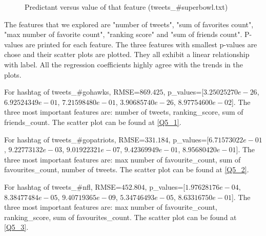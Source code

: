 \documentclass{article}
\begin{document}
\begin{figure}
\centering
{}
\caption{Predictant versus value of that feature (tweets\_\#superbowl.txt)} \label{Q5_6}
\end{figure}

The features that we explored are "number of tweets", "sum of favorites count", "max number of favorite count", "ranking score" and "sum of friends count". P-values are printed for each feature. The three features with smallest p-values are chose and their scatter plots are plotted. They all exhibit a linear relationship with label. All the regression coefficients highly agree with the trends in the plots.\newline

\indent For hashtag of tweets\_\#gohawks, RMSE=$869.425$, p\_values=[$3.25025270e-26$, $6.92524349e-01$, $7.21598480e-01$, $3.90685740e-26$, $8.97754600e-02$]. The three most important features are: number of tweets, ranking\_score, sum of friends\_count. The scatter plot can be found at \ref{Q5_1}.\newline

\indent For hashtag of tweets\_\#gopatriots, RMSE=$331.184$, p\_values=[$6.71573022e-01$, $9.22773132e-03$, $9.01922321e-07$, $9.42369949e-01$, $8.95680420e-01$]. The three most important features are: max number of favourite\_count, sum of favourites\_count, number of tweets. The scatter plot can be found at \ref{Q5_2}.\newline

\indent For hashtag of tweets\_\#nfl, RMSE=$452.804$, p\_values=[$1.97628176e-04$, $8.38477484e-05$, $9.40719365e-09$, $5.34746493e-05$, $8.63316750e-01$]. The three most important features are: max number of favourite\_count, ranking\_score, sum of favourites\_count. The scatter plot can be found at \ref{Q5_3}.\newline
\end{document}
